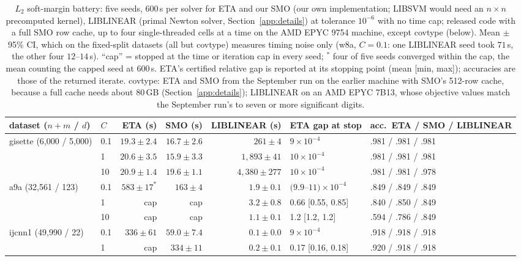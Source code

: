 \documentclass[pdflatex,sn-apa]{sn-jnl}%
\theoremstyle{thmstyleone}
\theoremstyle{thmstyletwo}
\begin{document}
\begin{table}\centering\scriptsize\setlength{\tabcolsep}{3pt}
\caption{$L_2$ soft-margin battery: five seeds, 600\,s per solver for
ETA and our SMO (our own
implementation; LIBSVM would need an $n\times n$ precomputed kernel),
LIBLINEAR
(primal Newton solver, Section~\ref{app:details}) at tolerance
$10^{-6}$ with no time cap; released code with a full SMO row cache, up to four
single-threaded cells at a time on the AMD EPYC 9754 machine, except
covtype (below). Mean $\pm$ 95\% CI, which on the fixed-split datasets
(all but covtype) measures timing noise only (w8a, $C{=}0.1$: one
LIBLINEAR seed took $71$\,s, the other four $12$--$14$\,s). ``cap'' = stopped at the time or iteration cap in every seed; $^\ast$ four of five seeds converged within
the cap, the mean counting the capped seed at $600$\,s. ETA's certified relative
gap is reported at its stopping point (mean [min, max]); accuracies are
those of the returned iterate. covtype: ETA and SMO from the September
run on the earlier machine with SMO's 512-row cache, because a full
cache needs about $80$\,GB (Section~\ref{app:details}); LIBLINEAR on an
AMD EPYC 7B13, whose objective values match the September run's to seven or more
significant digits.}\label{tab:l2}
\begin{tabular}{llrrrll}
\toprule
dataset ($n+m$ / $d$) & $C$ & ETA (s) & SMO (s) & LIBLINEAR (s) & ETA gap at stop & acc.\ ETA / SMO / LIBLINEAR \\
\midrule
gisette (6,000 / 5,000) & 0.1 & $19.3\pm2.4$ & $16.7\pm2.6$ & $261\pm4$ & $9\times10^{-4}$ & .981 / .981 / .981 \\
 & 1 & $20.6\pm3.5$ & $15.9\pm3.3$ & $1{,}893\pm41$ & $10\times10^{-4}$ & .981 / .981 / .981 \\
 & 10 & $20.9\pm1.4$ & $19.6\pm1.1$ & $4{,}380\pm277$ & $10\times10^{-4}$ & .981 / .981 / .978 \\
\midrule
a9a (32,561 / 123) & 0.1 & $583\pm17^{\ast}$ & $163\pm4$ & $1.9\pm0.1$ & $(9.9$--$11)\times10^{-4}$ & .849 / .849 / .849 \\
 & 1 & cap & cap & $3.2\pm0.8$ & 0.66 [0.55, 0.85] & .840 / .850 / .849 \\
 & 10 & cap & cap & $1.1\pm0.1$ & 1.2 [1.2, 1.2] & .594 / .786 / .849 \\
ijcnn1 (49,990 / 22) & 0.1 & $336\pm61$ & $59.0\pm7.4$ & $0.1\pm0.0$ & $9\times10^{-4}$ & .918 / .918 / .918 \\
 & 1 & cap & $334\pm11$ & $0.2\pm0.1$ & 0.17 [0.16, 0.18] & .920 / .918 / .918 \\

\end{tabular}
\end{table}
\end{document}
